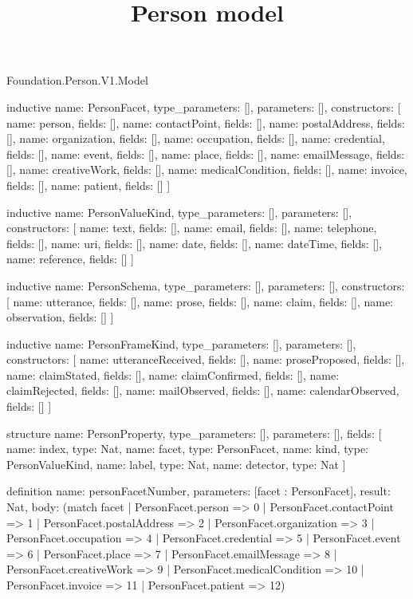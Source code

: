 \begin{lexlean}{Foundation.Person.V1.Model}
\title{Person model}
\begin{semanticmodule}
inductive{
  name: PersonFacet,
  type_parameters: [],
  parameters: [],
  constructors: [
    {name: person, fields: []},
    {name: contactPoint, fields: []},
    {name: postalAddress, fields: []},
    {name: organization, fields: []},
    {name: occupation, fields: []},
    {name: credential, fields: []},
    {name: event, fields: []},
    {name: place, fields: []},
    {name: emailMessage, fields: []},
    {name: creativeWork, fields: []},
    {name: medicalCondition, fields: []},
    {name: invoice, fields: []},
    {name: patient, fields: []}
  ]
}

inductive{
  name: PersonValueKind,
  type_parameters: [],
  parameters: [],
  constructors: [
    {name: text, fields: []},
    {name: email, fields: []},
    {name: telephone, fields: []},
    {name: uri, fields: []},
    {name: date, fields: []},
    {name: dateTime, fields: []},
    {name: reference, fields: []}
  ]
}

inductive{
  name: PersonSchema,
  type_parameters: [],
  parameters: [],
  constructors: [
    {name: utterance, fields: []},
    {name: prose, fields: []},
    {name: claim, fields: []},
    {name: observation, fields: []}
  ]
}

inductive{
  name: PersonFrameKind,
  type_parameters: [],
  parameters: [],
  constructors: [
    {name: utteranceReceived, fields: []},
    {name: proseProposed, fields: []},
    {name: claimStated, fields: []},
    {name: claimConfirmed, fields: []},
    {name: claimRejected, fields: []},
    {name: mailObserved, fields: []},
    {name: calendarObserved, fields: []}
  ]
}

structure{
  name: PersonProperty,
  type_parameters: [],
  parameters: [],
  fields: [
    {name: index, type: Nat},
    {name: facet, type: PersonFacet},
    {name: kind, type: PersonValueKind},
    {name: label, type: Nat},
    {name: detector, type: Nat}
  ]
}

definition{
  name: personFacetNumber,
  parameters: [facet : PersonFacet],
  result: Nat,
  body: (match facet
    | PersonFacet.person => 0
    | PersonFacet.contactPoint => 1
    | PersonFacet.postalAddress => 2
    | PersonFacet.organization => 3
    | PersonFacet.occupation => 4
    | PersonFacet.credential => 5
    | PersonFacet.event => 6
    | PersonFacet.place => 7
    | PersonFacet.emailMessage => 8
    | PersonFacet.creativeWork => 9
    | PersonFacet.medicalCondition => 10
    | PersonFacet.invoice => 11
    | PersonFacet.patient => 12)
}


\end{semanticmodule}
\end{lexlean}
